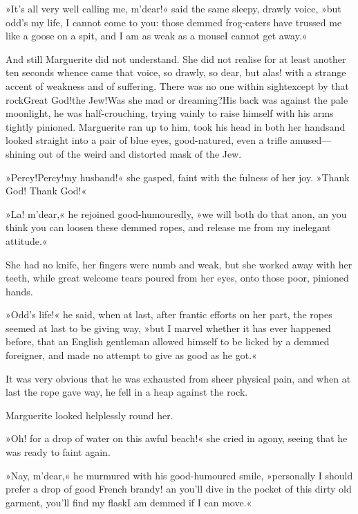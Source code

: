 »It's all very well calling me, m'dear!« said the same sleepy, drawly voice, »but odd's my life, I cannot come to you: those demmed frog-eaters have trussed me like a goose on a spit, and I am as weak as a mouse\textellipsis \allowbreak  I cannot get away.«

And still Marguerite did not understand. She did not realise for at least another ten seconds whence came that voice, so drawly, so dear, but alas! with a strange accent of weakness and of suffering. There was no one within sight\textellipsis \allowbreak  except by that rock\textellipsis \allowbreak  Great God!\textellipsis \allowbreak  the Jew!\textellipsis \allowbreak  Was she mad or dreaming?\textellipsis \allowbreak  His back was against the pale moonlight, he was half-crouching, trying vainly to raise himself with his arms tightly pinioned. Marguerite ran up to him, took his head in both her hands\textellipsis \allowbreak  and looked straight into a pair of blue eyes, good-natured, even a trifle amused—shining out of the weird and distorted mask of the Jew.

»Percy!\textellipsis \allowbreak  Percy!\textellipsis \allowbreak  my husband!« she gasped, faint with the fulness of her joy. »Thank God! Thank God!«

»La! m'dear,« he rejoined good-humouredly, »we will both do that anon, an you think you can loosen these demmed ropes, and release me from my inelegant attitude.«

She had no knife, her fingers were numb and weak, but she worked away with her teeth, while great welcome tears poured from her eyes, onto those poor, pinioned hands.

»Odd's life!« he said, when at last, after frantic efforts on her part, the ropes seemed at last to be giving way, »but I marvel whether it has ever happened before, that an English gentleman allowed himself to be licked by a demmed foreigner, and made no attempt to give as good as he got.«

It was very obvious that he was exhausted from sheer physical pain, and when at last the rope gave way, he fell in a heap against the rock.

Marguerite looked helplessly round her.

»Oh! for a drop of water on this awful beach!« she cried in agony, seeing that he was ready to faint again.

»Nay, m'dear,« he murmured with his good-humoured smile, »personally I should prefer a drop of good French brandy! an you'll dive in the pocket of this dirty old garment, you'll find my flask\textellipsis \allowbreak  I am demmed if I can move.«

